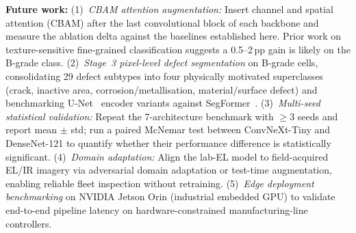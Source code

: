 \documentclass[conference]{IEEEtran}
\begin{document}
\textbf{Future work:}
(1)~\textit{CBAM attention augmentation:} Insert channel and spatial attention (CBAM) after the last convolutional block of each backbone and measure the ablation delta against the baselines established here. Prior work on texture-sensitive fine-grained classification suggests a 0.5--2\,pp gain is likely on the B-grade class.
(2)~\textit{Stage~3 pixel-level defect segmentation} on B-grade cells, consolidating 29 defect subtypes into four physically motivated superclasses (crack, inactive area, corrosion/metallisation, material/surface defect) and benchmarking U-Net~\cite{ronneberger2015} encoder variants against SegFormer~\cite{xie2021}.
(3)~\textit{Multi-seed statistical validation:} Repeat the 7-architecture benchmark with $\geq$3 seeds and report mean $\pm$ std; run a paired McNemar test between ConvNeXt-Tiny and DenseNet-121 to quantify whether their performance difference is statistically significant.
(4)~\textit{Domain adaptation:} Align the lab-EL model to field-acquired EL/IR imagery via adversarial domain adaptation or test-time augmentation, enabling reliable fleet inspection without retraining.
(5)~\textit{Edge deployment benchmarking} on NVIDIA Jetson Orin (industrial embedded GPU) to validate end-to-end pipeline latency on hardware-constrained manufacturing-line controllers.



\end{document}
